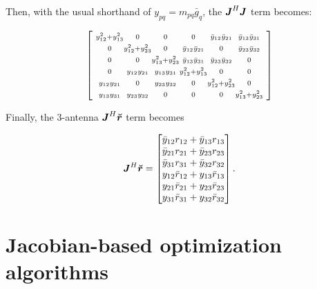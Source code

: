 \documentclass[useAMS,usenatbib]{mn2e}
\newcommand{\mat}[1]{{\bmath{#1}}}
\newcommand{\JJ}{\mat{J}} %
\begin{document}
Then, with the usual shorthand of $y_{pq} = m_{pq} \bar{g}_q$, the
$\JJ^H\JJ$ term becomes:

\begin{equation}
\label{eq:JHJ:3ant}
\Matrix{@{~}c@{}c@{}c@{}c@{}c@{}c@{~}}{
\scriptstyle\yysq{12}{13} &\scriptstyle 0             &\scriptstyle 0             &\scriptstyle 0             &\scriptstyle \bb{1}{2}       &\scriptstyle \bb{1}{3} \\
\scriptstyle0             &\scriptstyle \yysq{12}{23} &\scriptstyle 0             &\scriptstyle \bb{1}{2}       &\scriptstyle 0             &\scriptstyle \bb{2}{3} \\
\scriptstyle0             &\scriptstyle 0             &\scriptstyle \yysq{13}{23} &\scriptstyle \bb{1}{3}       &\scriptstyle \bb{2}{3}       &\scriptstyle 0       \\
\scriptstyle0             &\scriptstyle \bbb{1}{2}      &\scriptstyle \bbb{1}{3}      &\scriptstyle \yysq{12}{13} &\scriptstyle 0             &\scriptstyle 0       \\ 
\scriptstyle\bbb{1}{2}      &\scriptstyle 0             &\scriptstyle \bbb{2}{3}      &\scriptstyle 0             &\scriptstyle \yysq{12}{23} &\scriptstyle 0 \\
\scriptstyle\bbb{1}{3}      &\scriptstyle \bbb{2}{3}      &\scriptstyle 0             &\scriptstyle 0             &\scriptstyle 0             &\scriptstyle  \yysq{13}{23} \\
}
\end{equation}

Finally, the 3-antenna $\JJ^H\Rr$ term becomes

\begin{equation}
\label{eq:JHR:3ant}
\JJ^H\Rr = \Matrix{c}{
\bar{y}_{12} r_{12} + \bar{y}_{13} r_{13} \\
\bar{y}_{21} r_{21} + \bar{y}_{23} r_{23} \\
\bar{y}_{31} r_{31} + \bar{y}_{32} r_{32} \\
y_{12} \bar{r}_{12} + y_{13} \bar{r}_{13}   \\
y_{21} \bar{r}_{21} + y_{23} \bar{r}_{23}   \\
y_{31} \bar{r}_{31} + y_{32} \bar{r}_{32}   \\
}.
\end{equation}

\section{Jacobian-based optimization algorithms}
\label{sec:algs}
\end{document}
